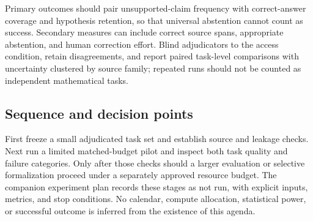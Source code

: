 Primary outcomes should pair unsupported-claim frequency with correct-answer coverage and hypothesis retention, so that universal abstention cannot count as success. Secondary measures can include correct source spans, appropriate abstention, and human correction effort. Blind adjudicators to the access condition, retain disagreements, and report paired task-level comparisons with uncertainty clustered by source family; repeated runs should not be counted as independent mathematical tasks.

\subsection{Sequence and decision points}
First freeze a small adjudicated task set and establish source and leakage checks. Next run a limited matched-budget pilot and inspect both task quality and failure categories. Only after those checks should a larger evaluation or selective formalization proceed under a separately approved resource budget. The companion experiment plan records these stages as not run, with explicit inputs, metrics, and stop conditions. No calendar, compute allocation, statistical power, or successful outcome is inferred from the existence of this agenda.
